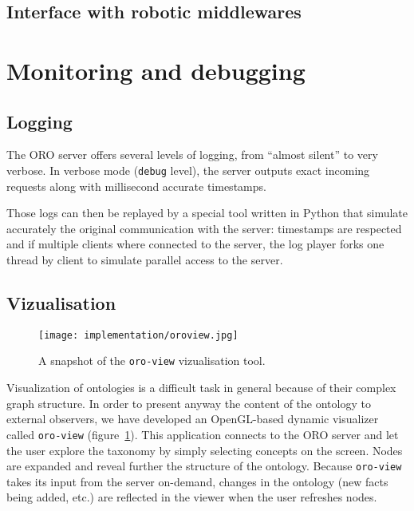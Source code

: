 \subsection{Interface with robotic middlewares}
\label{sect|interfacing-middlewares}

\section{Monitoring and debugging}
\label{sect|monitoring}

\subsection{Logging}

The ORO server offers several levels of logging, from ``almost silent'' to very
verbose. In verbose mode ({\tt debug} level), the server outputs exact incoming
requests along with millisecond accurate timestamps.

Those logs can then be replayed by a special tool written in Python that
simulate accurately the original communication with the server: timestamps are
respected and if multiple clients where connected to the server, the log player
forks one thread by client to simulate parallel access to the server.

\subsection{Vizualisation}

\begin{figure}
    \centering
    \texttt{[image: implementation/oroview.jpg]}
    \caption{A snapshot of the {\tt oro-view} vizualisation tool.}
    \label{fig|oroview}
\end{figure}

Visualization of ontologies is a difficult task in general because of their
complex graph structure. In order to present anyway the content of the ontology
to external observers, we have developed an OpenGL-based dynamic visualizer
called {\tt oro-view} (figure~\ref{fig|oroview}). This application connects to
the ORO server and let the user explore the taxonomy by simply selecting
concepts on the screen. Nodes are expanded and reveal further the structure of
the ontology. Because {\tt oro-view} takes its input from the server on-demand,
changes in the ontology (new facts being added, etc.) are reflected in the
viewer when the user refreshes nodes.

